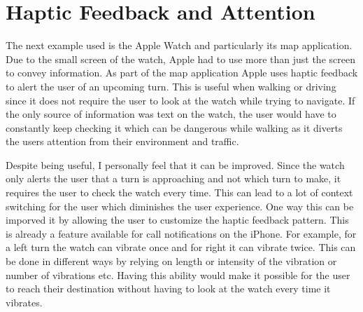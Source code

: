 \documentclass[12pt]{article}
\begin{document}
	\section{Haptic Feedback and Attention}
	The next example used is the Apple Watch and particularly its map application. Due to the small screen of the watch, Apple had to use more than just the screen to convey information. As part of the map application Apple uses haptic feedback to alert the user of an upcoming turn. This is useful when walking or driving since it does not require the user to look at the watch while trying to navigate. If the only source of information was text on the watch, the user would have to constantly keep checking it which can be dangerous while walking as it diverts the users attention from their environment and traffic. 
	
	Despite being useful, I personally feel that it can be improved. Since the watch only alerts the user that a turn is approaching and not which turn to make, it requires the user to check the watch every time. This can lead to a lot of context switching for the user which diminishes the user experience. One way this can be imporved it by allowing the user to customize the haptic feedback pattern. This is already a feature available for call notifications on the iPhone. For example, for a left turn the watch can vibrate once and for right it can vibrate twice. This can be done in different ways by relying on length or intensity of the vibration or number of vibrations etc. Having this ability would make it possible for the user to reach their destination without having to look at the watch every time it vibrates.
	
\end{document}
